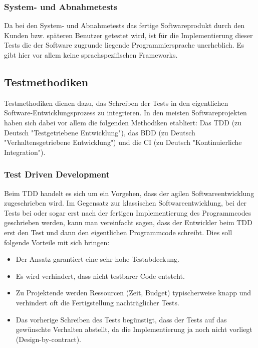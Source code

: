 \subsubsection{System- und Abnahmetests}

Da bei den System- und Abnahmetests das fertige Softwareprodukt durch den Kunden bzw. späteren Benutzer getestet wird, ist für die Implementierung dieser Tests die der Software zugrunde liegende Programmiersprache unerheblich. Es gibt hier vor allem keine sprachspezifischen Frameworks.

\subsection{Testmethodiken}

Testmethodiken dienen dazu, das Schreiben der Tests in den eigentlichen Software-Entwicklungsprozess zu integrieren. In den meisten Softwareprojekten haben sich dabei vor allem die folgenden Methodiken etabliert: Das \ac{TDD} (zu Deutsch "Testgetriebene Entwicklung"), das \ac{BDD} (zu Deutsch "Verhaltensgetriebene Entwicklung") und die \ac{CI} (zu Deutsch "Kontinuierliche Integration").

\subsubsection{Test Driven Development}

Beim \ac{TDD} handelt es sich um ein Vorgehen, dass der agilen Softwareentwicklung zugeschrieben wird. Im Gegensatz zur klassischen Softwareentwicklung, bei der Tests bei oder sogar erst nach der fertigen Implementierung des Programmcodes geschrieben werden, kann man vereinfacht sagen, dass der Entwickler beim \ac{TDD} erst den Test und dann den eigentlichen Programmcode schreibt. Dies soll folgende Vorteile mit sich bringen:

\begin{itemize}
  \item Der Ansatz garantiert eine sehr hohe Testabdeckung.
  \item Es wird verhindert, dass nicht testbarer Code entsteht.
  \item Zu Projektende werden Ressourcen (Zeit, Budget) typischerweise knapp und verhindert oft die Fertigstellung nachträglicher Tests.
  \item Das vorherige Schreiben des Tests begünstigt, dass der Tests auf das gewünschte Verhalten abstellt, da die Implementierung ja noch nicht vorliegt (Design-by-contract).
\end{itemize}


